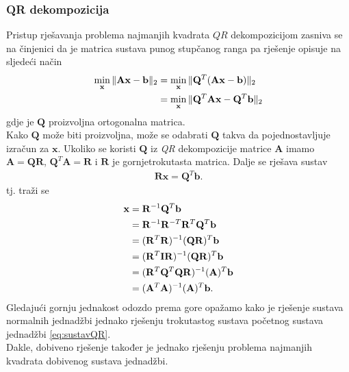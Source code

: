 \documentclass[a4paper,twoside,12pt]{memoir} %
\begin{document}
\subsubsection{QR dekompozicija}\label{sec:QR}
Pristup rješavanja problema najmanjih kvadrata $QR$ dekompozicijom zasniva se na činjenici da je matrica sustava punog stupčanog ranga pa rješenje opisuje na sljedeći način
\begin{align}\label{eq:useQR}
\min_{\mathbf{x}} \| \mathbf{A}\mathbf{x} - \mathbf{b} \|_2	
& = \min_{\mathbf{x}} \| \mathbf{Q}^T(\mathbf{A}\mathbf{x} - \mathbf{b}) \|_2 \\
& =  \min_{\mathbf{x}}\| \mathbf{Q}^T \mathbf{A}\mathbf{x} - \mathbf{Q}^T \mathbf{b} \|_2	\notag
\end{align}
gdje je $\mathbf{Q}$ proizvoljna ortogonalna matrica.\\
Kako $\mathbf{Q}$ može biti proizvoljna, može se odabrati $\mathbf{Q}$ takva da pojednostavljuje izračun za $\mathbf{x}$.
Ukoliko se koristi $\mathbf{Q}$ iz \textit{QR} dekompozicije matrice $\mathbf{A}$ imamo $\mathbf{A} = \mathbf{QR}$, $\mathbf{Q}^T\mathbf{A} = \mathbf{R}$ i $\mathbf{R}$ je gornjetrokutasta matrica.
Dalje se rješava sustav
\begin{align}\label{eq:sustavQR}
\mathbf{R}\mathbf{x} = \mathbf{Q}^T\mathbf{b}.
\end{align}
tj. traži se  
\begin{align}
\mathbf{x} & = \mathbf{R}^{-1}\mathbf{Q}^T\mathbf{b} \notag \\
& = \mathbf{R}^{-1}\mathbf{R}^{-T}\mathbf{R}^{T}\mathbf{Q}^T\mathbf{b} \notag \\
& = (\mathbf{R}^{T}\mathbf{R})^{-1}(\mathbf{QR})^{T}\mathbf{b} \\
& = (\mathbf{R}^{T} \mathbf{I} \mathbf{R})^{-1}(\mathbf{QR})^{T}\mathbf{b}  \notag \\
& = (\mathbf{R}^{T} \mathbf{Q}^T\mathbf{Q} \mathbf{R})^{-1}(\mathbf{A})^{T}\mathbf{b} \notag \\
& = (\mathbf{A}^{T}\mathbf{A})^{-1}(\mathbf{A})^{T}\mathbf{b}.\notag 
\end{align}
Gledajući gornju jednakost odozdo prema gore opažamo kako je rješenje sustava normalnih jednadžbi jednako rješenju trokutastog sustava početnog sustava jednadžbi \ref{eq:sustavQR}.\\
Dakle, dobiveno rješenje također je jednako rješenju problema najmanjih kvadrata dobivenog sustava jednadžbi.
\end{document}

